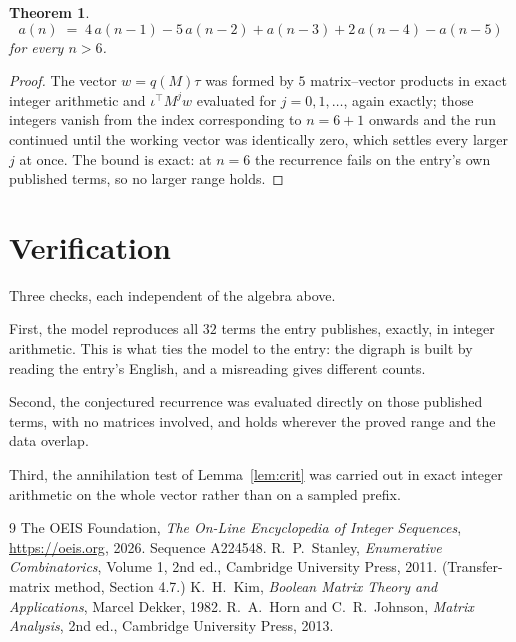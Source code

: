 \documentclass[11pt,a4paper]{article}
\theoremstyle{plain}
\newtheorem{theorem}{Theorem}
\theoremstyle{definition}
\begin{document}
\begin{theorem}
\[
a(n)\;=\;4\,a(n-1) - 5\,a(n-2) + a(n-3) + 2\,a(n-4) - a(n-5)
\]
for every $n>6$.
\end{theorem}

\begin{proof}
The vector $w=q(M)\tau$ was formed by $5$ matrix--vector products in exact integer
arithmetic and $\iota^{\!\top}M^{j}w$ evaluated for $j=0,1,\dots$, again exactly; those
integers vanish from the index corresponding to $n=6+1$ onwards and the run continued
until the working vector was identically zero, which settles every larger $j$ at once. The bound is exact: at $n=6$ the recurrence fails on the entry's own published terms, so no larger range holds.
\end{proof}

\section{Verification}

Three checks, each independent of the algebra above.

First, the model reproduces all $32$ terms the entry publishes, exactly, in integer
arithmetic. This is what ties the model to the entry: the digraph is built by reading the
entry's English, and a misreading gives different counts.

Second, the conjectured recurrence was evaluated directly on those published terms, with no
matrices involved, and holds wherever the proved range and the data overlap.

Third, the annihilation test of Lemma~\ref{lem:crit} was carried out in exact integer
arithmetic on the whole vector rather than on a sampled prefix.

\begin{thebibliography}{9}
 The OEIS Foundation, \emph{The On-Line Encyclopedia of Integer
Sequences}, \url{https://oeis.org}, 2026. Sequence A224548.
 R.~P.~Stanley, \emph{Enumerative Combinatorics}, Volume 1, 2nd ed.,
Cambridge University Press, 2011. (Transfer-matrix method, Section 4.7.)
 K.~H.~Kim, \emph{Boolean Matrix Theory and Applications}, Marcel Dekker,
1982.
 R.~A.~Horn and C.~R.~Johnson, \emph{Matrix Analysis}, 2nd ed., Cambridge
University Press, 2013.
\end{thebibliography}
\end{document}
